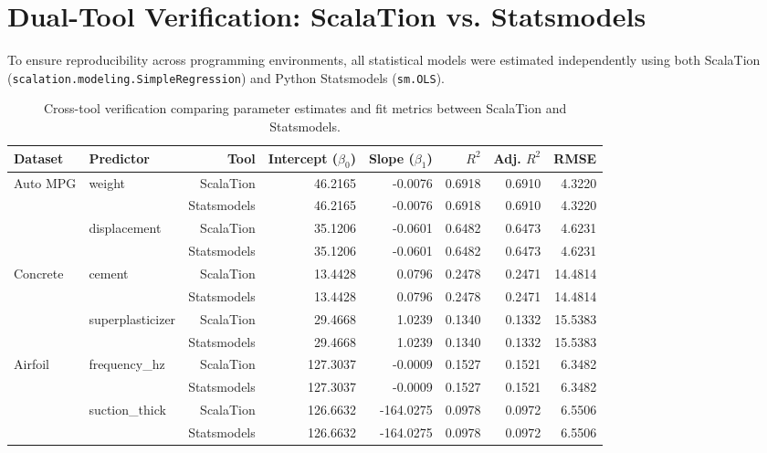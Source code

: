 \documentclass[11pt]{article}
\begin{document}
\section{Dual-Tool Verification: ScalaTion vs. Statsmodels}
To ensure reproducibility across programming environments, all statistical models were estimated independently using both ScalaTion (\texttt{scalation.modeling.SimpleRegression}) and Python Statsmodels (\texttt{sm.OLS}). 

\begin{table}[H]
\centering
\small
\begin{tabular}{llrrrrrr}
\toprule
\textbf{Dataset} & \textbf{Predictor} & \textbf{Tool} & \textbf{Intercept ($\beta_0$)} & \textbf{Slope ($\beta_1$)} & \textbf{$R^2$} & \textbf{Adj. $R^2$} & \textbf{RMSE} \\
\midrule
Auto MPG & weight & ScalaTion & 46.2165 & -0.0076 & 0.6918 & 0.6910 & 4.3220 \\
         &        & Statsmodels & 46.2165 & -0.0076 & 0.6918 & 0.6910 & 4.3220 \\
\cmidrule{2-8}
         & displacement & ScalaTion & 35.1206 & -0.0601 & 0.6482 & 0.6473 & 4.6231 \\
         &              & Statsmodels & 35.1206 & -0.0601 & 0.6482 & 0.6473 & 4.6231 \\
\midrule
Concrete & cement & ScalaTion & 13.4428 & 0.0796 & 0.2478 & 0.2471 & 14.4814 \\
         &        & Statsmodels & 13.4428 & 0.0796 & 0.2478 & 0.2471 & 14.4814 \\
\cmidrule{2-8}
         & superplasticizer & ScalaTion & 29.4668 & 1.0239 & 0.1340 & 0.1332 & 15.5383 \\
         &                  & Statsmodels & 29.4668 & 1.0239 & 0.1340 & 0.1332 & 15.5383 \\
\midrule
Airfoil  & frequency\_hz & ScalaTion & 127.3037 & -0.0009 & 0.1527 & 0.1521 & 6.3482 \\
         &               & Statsmodels & 127.3037 & -0.0009 & 0.1527 & 0.1521 & 6.3482 \\
\cmidrule{2-8}
         & suction\_thick & ScalaTion & 126.6632 & -164.0275 & 0.0978 & 0.0972 & 6.5506 \\
         &               & Statsmodels & 126.6632 & -164.0275 & 0.0978 & 0.0972 & 6.5506 \\
\bottomrule
\end{tabular}
\caption{Cross-tool verification comparing parameter estimates and fit metrics between ScalaTion and Statsmodels.}
\label{tab:cross_tool}
\end{table}
\end{document}
